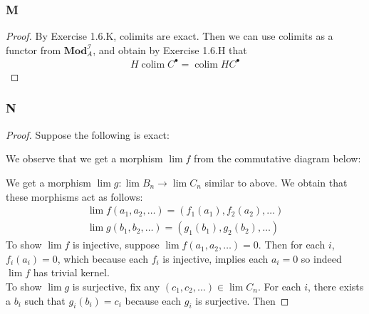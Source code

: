 \documentclass{article}
\newcommand{\fI}{\mathscr{I}}
\newcommand{\Mod}{\mathbf{Mod}} %
\DeclareMathOperator{\colim}{\mathrm{colim}}
\begin{document}
\subsubsection{M}
\begin{proof}
    By Exercise 1.6.K, colimits are exact. Then we can use colimits as a functor from $\Mod_A^\fI$, and obtain by Exercise 1.6.H that
    \begin{align*}
        H \colim C^\bullet =\colim HC^\bullet
    \end{align*}
\end{proof}
\subsubsection{N}\label{1.6.N}
\begin{proof}
    Suppose the following is exact:
    \begin{center}
    \end{center}
    We observe that we get a morphism $\lim f$ from the commutative diagram below:
   \begin{center}
    \end{center}
    We get a morphism $\lim g:\lim B_n \to \lim C_n$ similar to above. We obtain that these morphisms act as follows:
    \begin{align*}
        \lim f(a_1,a_2,\dots)=(f_1(a_1),f_2(a_2),\dots)\\
        \lim g(b_1,b_2,\dots)=(g_1(b_1),g_2(b_2),\dots)
    \end{align*}
    To show $\lim f$ is injective, suppose $\lim f(a_1,a_2,\dots)=0$. Then for each $i$, $f_i(a_i)=0$, which because each $f_i$ is injective, implies each $a_i=0$ so indeed $\lim f$ has trivial kernel.\\
    To show $\lim g$ is surjective, fix any $(c_1,c_2,\dots)\in \lim C_n$. For each $i$, there exists a $b_i$ such that $g_i(b_i)=c_i$ because each $g_i$ is surjective. Then

\end{proof}
\end{document}
